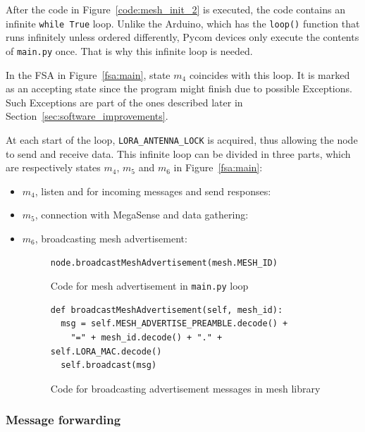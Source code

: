 				After the code in Figure~\ref{code:mesh_init_2} is executed, the code contains an infinite \texttt{while True} loop.
				Unlike the Arduino, which has the \texttt{loop()} function that runs infinitely unless ordered differently, Pycom devices only execute the contents of \texttt{main.py} once. 
				That is why this infinite loop is needed.
				
				In the FSA in Figure~\ref{fsa:main}, state $ m_{4} $ coincides with this loop.
				It is marked as an accepting state since the program might finish due to possible Exceptions.
				Such Exceptions are part of the ones described later in Section~\ref{sec:software_improvements}.
				
				At each start of the loop, \texttt{LORA\_ANTENNA\_LOCK} is acquired, thus allowing the node to send and receive data.
				This infinite loop can be divided in three parts, which are respectively states $ m_4 $, $ m_5 $ and $ m_6 $ in Figure~\ref{fsa:main}:
				\begin{itemize}
					\item $ m_4 $, listen and for incoming messages and send responses:
					\item $ m_5 $, connection with MegaSense and data gathering:
					\item $ m_6 $, broadcasting mesh advertisement:
						\begin{figure}[H]
							\begin{lstlisting}
node.broadcastMeshAdvertisement(mesh.MESH_ID)
							\end{lstlisting}
							\caption{Code for mesh advertisement in \texttt{main.py} loop}
							\label{code:mesh_advertisement_main}
						\end{figure}
					
						\begin{figure}
							\begin{lstlisting}
def broadcastMeshAdvertisement(self, mesh_id):
  msg = self.MESH_ADVERTISE_PREAMBLE.decode() + 
    "=" + mesh_id.decode() + "." + self.LORA_MAC.decode()
  self.broadcast(msg)
							\end{lstlisting}
							\caption{Code for broadcasting advertisement messages in mesh library}
							\label{code:mesh_advertisement_library}
						\end{figure}
				\end{itemize}	
			
			\subsubsection{Message forwarding}
			
